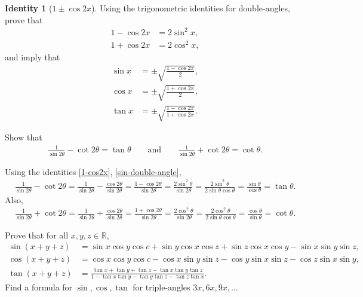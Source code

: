 \documentclass[12pt,a4paper]{memoir}
\theoremstyle{definition}
\newtheorem{identity}{Identity}
\begin{document}
\begin{identity}[$1\pm\cos 2x$]
	Using the trigonometric identities for double-angles, prove that
	\begin{align}
		1 - \cos 2x &= 2 \sin^2 x, \label{1-cos2x}\\
		1 + \cos 2x &= 2 \cos^2 x, \label{1+cos2x}
	\end{align}
	and imply that
	\begin{align}
		\sin x & = \pm \sqrt{\frac{1-\cos 2x}{2}},\\
		\cos x & = \pm \sqrt{\frac{1+\cos 2x}{2}},\\
		\tan x & = \pm \sqrt{\frac{1-\cos 2x}{1+\cos 2x}}.
	\end{align}
\end{identity}




	\begin{question}[name=($\cot x - \cot 2x$) Exercise Identity]\label{q:cot2x}
		Show that 
		\begin{align*}
			\frac{1}{\sin 2\theta} - \cot 2\theta =\tan \theta \qquad \text{and} \qquad \frac{1}{\sin 2\theta} + \cot 2\theta = \cot \theta.
		\end{align*}
	\end{question}


\begin{solution}[name=($\cot x-\cot 2x$) Exercise Identity]
	Using the identities \eqref{1-cos2x}, \eqref{sin-double-angle},
	\begin{align*}
		\frac{1}{\sin 2\theta} - \cot 2\theta  = \frac{1}{\sin 2\theta} - \frac{\cos 2\theta }{\sin 2\theta} = \frac{1 - \cos 2\theta}{\sin 2\theta} = \frac{2\sin^2 \theta}{\sin 2\theta} = \frac{2\sin^2 \theta}{2\sin \theta \cos \theta } = \frac{\sin \theta}{\cos \theta}= \tan \theta. 
	\end{align*}
	Also,
	\begin{align*}
		\frac{1}{\sin 2\theta} + \cot 2\theta  = \frac{1}{\sin 2\theta} + \frac{\cos 2\theta }{\sin 2\theta} = \frac{1+\cos 2\theta}{\sin 2\theta} = \frac{2\cos^2 \theta}{\sin 2\theta} = \frac{2\cos^2 \theta}{2\sin \theta \cos \theta } = \frac{\cos \theta}{\sin \theta}= \cot \theta.
	\end{align*}
\end{solution}




	\begin{question}[name=Sum of Three Angles Identity]
		Prove that for all $x,y,z \in \mathbb R$,
		\begin{align}
			\sin(x+y+z) &= \sin x \cos y \cos c + \sin y \cos x \cos z + \sin z \cos x \cos y - \sin x \sin y \sin z, \label{id:sin-sum-of-three-angles} \\
			\cos(x+y+z) &= \cos x \cos y \cos c - \cos x \sin y \sin z - \cos y \sin x \sin z - \cos z \sin x \sin y, \label{id:cos-sum-of-three-angles} \\
			\tan(x+y+z) &= \frac{\tan x + \tan y + \tan z - \tan x \tan y \tan z}{1 - \tan x \tan y - \tan y \tan z - \tan z \tan x}. \label{id:tan-sum-of-three-angles}
		\end{align}
		Find a formula for $\sin, \cos, \tan$ for triple-angles $3x, 6x, 9x, \dots$
	\end{question}
\end{document}
